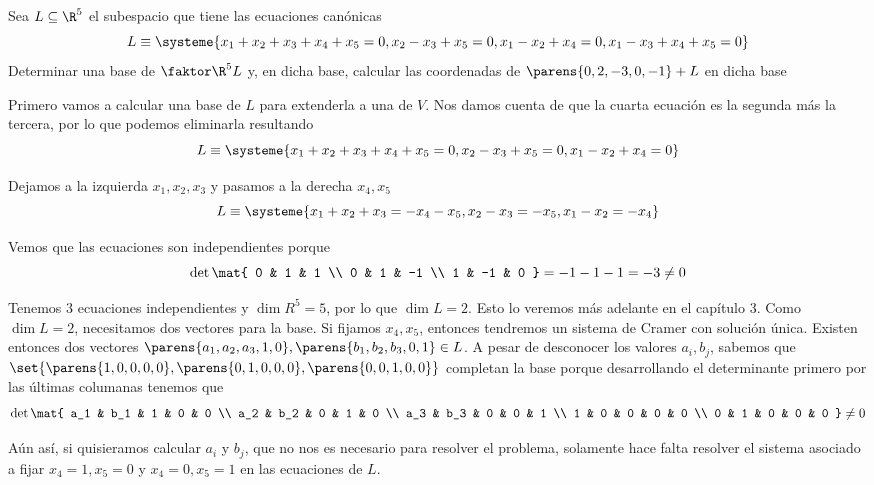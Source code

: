 \documentclass[../algebra_lineal.tex]{subfiles}
\begin{document}
\begin{example}
    Sea $L \subseteq \R^5$ el subespacio que tiene las ecuaciones canónicas 
    \[
        L \equiv \systeme{
            x_1 + x_2 + x_3 + x_4 + x_5 = 0, 
            x_2 - x_3 + x_5 = 0, 
            x_1 - x_2 + x_4 = 0,  
            x_1 - x_3 + x_4 + x_5 = 0
            }
    \]
    Determinar una base de $\qs{\R^5}{L}$ y, en dicha base, calcular las coordenadas de $\parens{0, 2, -3, 0, -1} + L$ en dicha base
\end{example}
\begin{solution}
Primero vamos a calcular una base de $L$ para extenderla a una de $V$. Nos damos cuenta de que la cuarta ecuación es la segunda más la tercera, por lo que podemos eliminarla resultando
\[
    L \equiv \systeme{
        x_1 + x_2 + x_3 + x_4 + x_5 = 0, 
        x_2 - x_3 + x_5 = 0, 
        x_1 - x_2 + x_4 = 0
        }
\]

Dejamos a la izquierda $x_1, x_2, x_3$ y pasamos a la derecha $x_4, x_5$
\[
    L \equiv \systeme{
        x_1 + x_2 + x_3 = - x_4 - x_5, 
        x_2 - x_3 = - x_5, 
        x_1 - x_2 = - x_4
        }
\]

Vemos que las ecuaciones son independientes porque 
\[
\det\mat{
    0 & 1 & 1 \\
    0 & 1 & -1 \\
    1 & -1 & 0 
} = -1 -1 -1 = -3 \ne 0
\]

Tenemos 3 ecuaciones independientes y $\dim{R^5}=5$, por lo que $\dim{L} = 2$. Esto lo veremos más adelante en el capítulo 3. Como $\dim{L}=2$, necesitamos dos vectores para la base. Si fijamos $x_4, x_5$, entonces tendremos un sistema de Cramer con solución única. Existen entonces dos vectores $\parens{a_1, a_2, a_3, 1, 0}, \parens{b_1, b_2, b_3, 0, 1} \in L$. A pesar de desconocer los valores $a_i, b_j$, sabemos que $\set{\parens{1, 0, 0, 0, 0}, \parens{0, 1, 0, 0, 0}, \parens{0, 0, 1, 0, 0}}$ completan la base porque desarrollando el determinante primero por las últimas columanas tenemos que
\[
  \det\mat{
      a_1 & b_1 & 1 & 0 & 0 \\
      a_2 & b_2 & 0 & 1 & 0 \\
      a_3 & b_3 & 0 & 0 & 1 \\
      1 & 0 & 0 & 0 & 0 \\
      0 & 1 & 0 & 0 & 0
  } \ne 0
\]

Aún así, si quisieramos calcular $a_i$ y $b_j$, que no nos es necesario para resolver el problema, solamente hace falta resolver el sistema asociado a fijar $x_4 = 1, x_5 = 0$ y $x_4 = 0, x_5 = 1$ en las ecuaciones de $L$. 


\end{solution}
\end{document}
